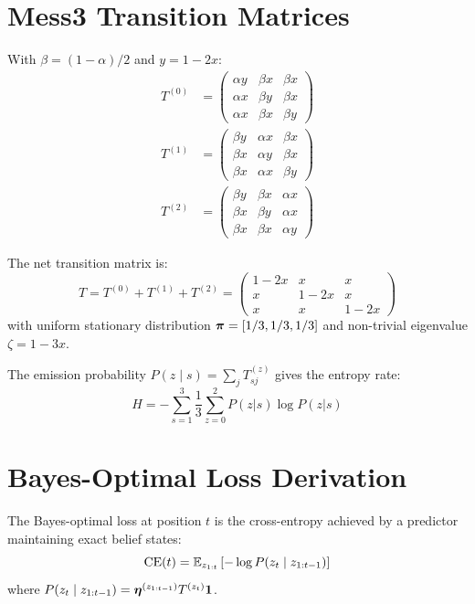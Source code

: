 \section{Mess3 Transition Matrices}
\label{app:mess3}

With $\beta = (1-\alpha)/2$ and $y = 1-2x$:
\begin{align}
T^{(0)} &= \begin{pmatrix} \alpha y & \beta x & \beta x \\ \alpha x & \beta y & \beta x \\ \alpha x & \beta x & \beta y \end{pmatrix} \\
T^{(1)} &= \begin{pmatrix} \beta y & \alpha x & \beta x \\ \beta x & \alpha y & \beta x \\ \beta x & \alpha x & \beta y \end{pmatrix} \\
T^{(2)} &= \begin{pmatrix} \beta y & \beta x & \alpha x \\ \beta x & \beta y & \alpha x \\ \beta x & \beta x & \alpha y \end{pmatrix}
\end{align}

The net transition matrix is:
\begin{equation}
T = T^{(0)} + T^{(1)} + T^{(2)} = \begin{pmatrix} 1-2x & x & x \\ x & 1-2x & x \\ x & x & 1-2x \end{pmatrix}
\end{equation}
with uniform stationary distribution $\bm{\pi} = [1/3, 1/3, 1/3]$ and non-trivial eigenvalue $\zeta = 1 - 3x$.

The emission probability $P(z \mid s) = \sum_j T^{(z)}_{sj}$ gives the entropy rate:
\begin{equation}
H = -\sum_{s=1}^{3} \frac{1}{3} \sum_{z=0}^{2} P(z|s) \log P(z|s)
\end{equation}

\section{Bayes-Optimal Loss Derivation}
\label{app:bayes}

The Bayes-optimal loss at position $t$ is the cross-entropy achieved by a predictor maintaining exact belief states:
\begin{equation}
\text{CE}(t) = \mathbb{E}_{z_{1:t}} \left[ -\log P(z_t \mid z_{1:t-1}) \right]
\end{equation}
where $P(z_t \mid z_{1:t-1}) = \bm{\eta}^{(z_{1:t-1})} T^{(z_t)} \mathbf{1}$.

